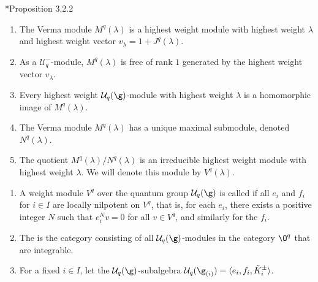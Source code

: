 \documentclass[11pt,leqno,oneside]{amsart}
\numberwithin{thm}{section}
\newcommand{\U}{\mathcal{U}}
\begin{document}
\begin{prop}
  \cite{hong-kang}*{Proposition 3.2.2}
  \begin{enumerate}
  \item The Verma module \(M^q(\lambda)\) is a highest weight module
    with highest weight \(\lambda\) and highest weight vector
    \(v_\lambda = 1 + J^q(\lambda)\).
  \item As a \(\U_q^-\)-module, \(M^q(\lambda)\) is free of rank \(1\)
    generated by the highest weight vector \(v_\lambda\).
  \item Every highest weight \(\U_q(\g)\)-module with highest weight
    \(\lambda\) is a homomorphic image of \(M^q(\lambda)\).
  \item The Verma module \(M^q(\lambda)\) has a unique maximal
    submodule, denoted \(N^q(\lambda)\).
  \item The quotient \(M^q(\lambda)/N^q(\lambda)\) is an irreducible
    highest weight module with highest weight \(\lambda\). We will
    denote this module by \(V^q(\lambda)\).
  \end{enumerate}
\end{prop}
\begin{defn}
  \begin{enumerate}
  \item A weight module \(V^q\) over the quantum group \(\U_q(\g)\) is
    called  if all \(e_i\) and \(f_i\) for \(i \in I\)
    are locally nilpotent on \(V^q\), that is, for each \(e_i\), there
    exists a positive integer \(N\) such that \(e_i^N v = 0\) for all
    \(v \in V^q\), and similarly for the \(f_i\).
  \item The  is the category consisting of
    all \(\U_q(\g)\)-modules in the category \(\O^q\) that are
    integrable.
  \item For a fixed \(i \in I\), let the \(\U_q(\g)\)-subalgebra
    \(\U_q(\g_{(i)}) = \langle e_i, 
    f_i, \tilde{K}_i^\pm \rangle\).
  \end{enumerate}
\end{defn}
\end{document}
